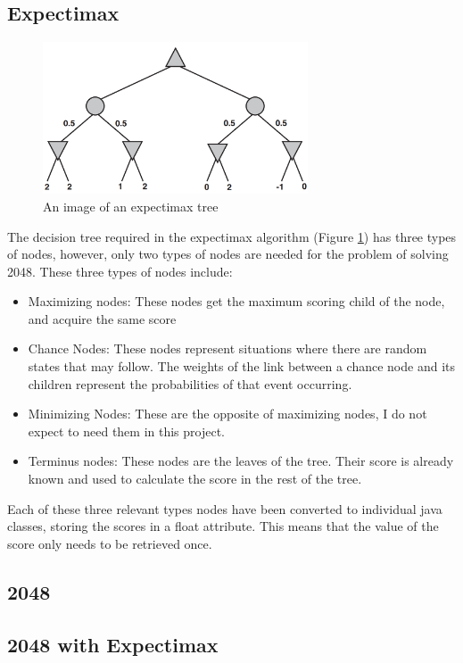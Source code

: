 \documentclass{article}
\begin{document}
\subsection{Expectimax}
\label{subsec:expectimax}
\begin{figure}
    \centering
    \includegraphics[width=0.7\textwidth]{expectimax.png}
    \caption{An image of an expectimax tree \cite[p.~200]{russell2010artificial}}
    \label{fig:expectree}
\end{figure}
The decision tree required in the expectimax algorithm (Figure \ref{fig:expectree}) has three types of nodes, however, only two types of nodes are needed for the problem of solving 2048. These three types of nodes include:
\begin{itemize}
    \item Maximizing nodes: These nodes get the maximum scoring child of the node, and acquire the same score
    \item Chance Nodes: These nodes represent situations where there are random states that may follow. The weights of the link between a chance node and its children represent the probabilities of that event occurring.
    \item Minimizing Nodes: These are the opposite of maximizing nodes, I do not expect to need them in this project.
    \item Terminus nodes: These nodes are the leaves of the tree. Their score is already known and used to calculate the score in the rest of the tree.
\end{itemize}
Each of these three relevant types nodes have been converted to individual java classes, storing the scores in a float attribute. This means that the value of the score only needs to be retrieved once.

\subsection{2048}
\subsection{2048 with Expectimax}
\end{document}
